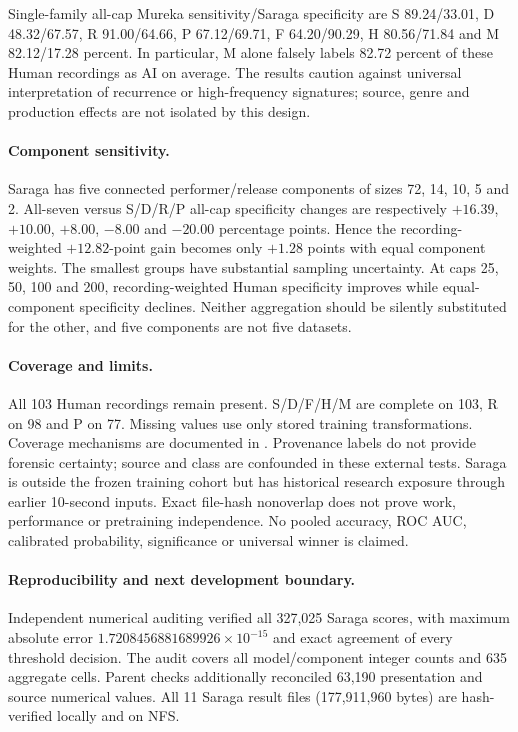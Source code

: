 Single-family all-cap Mureka sensitivity/Saraga specificity are S
89.24/33.01, D 48.32/67.57, R 91.00/64.66, P 67.12/69.71, F 64.20/90.29,
H 80.56/71.84 and M 82.12/17.28 percent. In particular, M alone falsely labels
82.72 percent of these Human recordings as AI on average. The results caution
against universal interpretation of recurrence or high-frequency signatures;
source, genre and production effects are not isolated by this design.

\paragraph{Component sensitivity.}
Saraga has five connected performer/release components of sizes 72, 14, 10,
5 and 2. All-seven versus S/D/R/P all-cap specificity changes are respectively
$+16.39$, $+10.00$, $+8.00$, $-8.00$ and $-20.00$ percentage points. Hence the
recording-weighted $+12.82$-point gain becomes only $+1.28$ points with equal
component weights. The smallest groups have substantial sampling uncertainty.
At caps 25, 50, 100 and 200, recording-weighted Human specificity improves
while equal-component specificity declines. Neither aggregation should be
silently substituted for the other, and five components are not five datasets.

\paragraph{Coverage and limits.}
All 103 Human recordings remain present. S/D/F/H/M are complete on 103,
R on 98 and P on 77. Missing values use only stored training transformations.
Coverage mechanisms are documented in
. Provenance labels do not provide
forensic certainty; source and class are confounded in these external tests.
Saraga is outside the frozen training cohort but has historical research
exposure through earlier 10-second inputs. Exact file-hash nonoverlap does
not prove work, performance or pretraining independence. No pooled accuracy,
ROC AUC, calibrated probability, significance or universal winner is claimed.

\paragraph{Reproducibility and next development boundary.}
Independent numerical auditing verified all 327,025 Saraga scores, with maximum
absolute error $1.7208456881689926\times10^{-15}$ and exact agreement of every
threshold decision. The audit covers all model/component integer counts and
635 aggregate cells. Parent checks additionally reconciled 63,190 presentation
and source numerical values. All 11 Saraga result files (177,911,960 bytes)
are hash-verified locally and on NFS.

